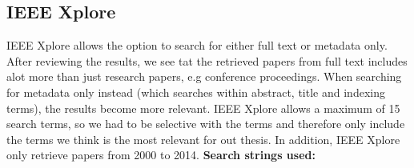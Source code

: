 \subsection{IEEE Xplore}
IEEE Xplore allows the option to search for either full text or metadata only. After reviewing the results, we see tat the retrieved papers from full text includes alot more than just research papers, e.g conference proceedings. When searching for metadata only instead (which searches within abstract, title and indexing terms), the results become more relevant. IEEE Xplore allows a maximum of 15 search terms, so we had to be selective with the terms and therefore only include the terms we think is the most relevant for out thesis. In addition, IEEE Xplore only retrieve papers from 2000 to 2014.
\newline
\textbf{Search strings used:}
